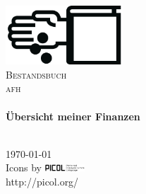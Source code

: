 \begin{titlepage}

\begin{center}


\includegraphics[width=0.33\textwidth]{templates/afh/logo.jpg}\\[1cm]

\textsc{\LARGE Bestandsbuch}\\[1.5cm]

\textsc{\Large afh}\\[0.5cm]


\HRule \\[0.4cm]
{ \huge \bfseries Übersicht meiner Finanzen}\\[0.4cm]

\HRule \\[1.5cm]

\vfill

{\large \today }
{\large \currenttime }
\\[4cm]
{\tiny
  Icons by
  \includegraphics[width=1.5cm]{templates/afh/picol.png}\\
  http://picol.org/
}

\end{center}

\end{titlepage}
